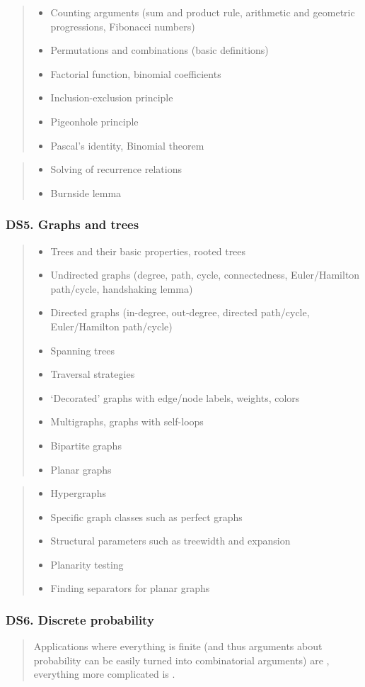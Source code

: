 \documentclass[a4paper,11pt,oneside]{article}
\newcommand{\cmark}{\ding{51}}%
\newcommand{\xmark}{\ding{55}}%
\newcommand{\CC}[1]{#1}
\newcommand{\cincl}{{\small\cmark}}
\newcommand{\cdef}{{\small\cmark\faFileTextO}}
\newcommand{\ccode}{{\small\cmark\faFileText}}
\newcommand{\cnfoc}{{\small\faQuestion}}
\newcommand{\cexcl}{{\small\xmark}}
\newcommand{\Iincluded}{\item[\hbox to 1.8em{\cincl\hfill}]}
\newcommand{\Idefine}{\item[\hbox to 1.8em{\cdef\hfill}]}
\newcommand{\Icodeonly}{\item[\hbox to 1.8em{\ccode\hfill}]}
\newcommand{\Iexcluded}{\item[\hbox to 1.8em{\cexcl\hfill}]}
\newenvironment{myitemize}{\begin{quote}\begin{itemize}\itemsep 0pt}{\end{itemize}\end{quote}}
\begin{document}
        \begin{myitemize}
        \Iincluded\CC{Counting arguments (sum and product rule, arithmetic and geometric progressions, Fibonacci numbers)}
        \Idefine\CC{Permutations and combinations (basic definitions)}
        \Idefine Factorial function, binomial coefficients
        \Icodeonly\CC{Inclusion-exclusion principle}
        \Icodeonly\CC{Pigeonhole principle}
        \Icodeonly\CC{Pascal's identity}, \CC{Binomial theorem}
        \end{myitemize}

        \begin{myitemize}
        \Iexcluded Solving of recurrence relations
        \Iexcluded Burnside lemma
        \end{myitemize}
  
    \subsubsection*{DS5. Graphs and trees}

        \begin{myitemize}
        \Idefine\CC{Trees} and their basic properties, rooted trees
        \Idefine\CC{Undirected graphs} (degree, path, cycle, connectedness, Euler/Hamil\-ton path/cycle, handshaking lemma)
        \Idefine\CC{Directed graphs} (in-degree, out-degree, directed path/cycle, Euler/Hamilton path/cycle)
        \Idefine\CC{Spanning trees}
        \Idefine\CC{Traversal strategies}
        \Idefine `Decorated' graphs with edge/node labels, weights, colors
        \Idefine Multigraphs, graphs with self-loops
        \Idefine Bipartite graphs
        \Icodeonly Planar graphs
        \end{myitemize}

        \begin{myitemize}
        \Iexcluded Hypergraphs
        \Iexcluded Specific graph classes such as perfect graphs
        \Iexcluded Structural parameters such as treewidth and expansion
        \Iexcluded Planarity testing
        \Iexcluded Finding separators for planar graphs
        \end{myitemize}

    \subsubsection*{DS6. Discrete probability}
  
        \begin{quote}
        Applications where everything is finite (and thus arguments about probability can be easily
        turned into combinatorial arguments) are \cnfoc, everything more complicated
        is \cexcl.
        \end{quote}
\end{document}
